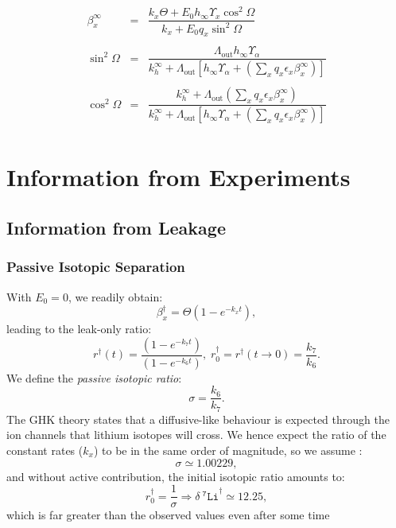 \documentclass[aps,onecolumn,12pt]{revtex4}
\newcommand{\mychem}[1]{\mathtt{#1}}
\newcommand{\spLi}[1]{{~^{\mychem{#1}}\mychem{Li}}}
\newcommand{\deltaLi}{ {\delta\!\!\!\spLi{7}} }
\newcommand{\LiAll}{\Lambda}
\newcommand{\LiAllOut}{{\LiAll}_{\mathrm{out}}}
\newcommand{\todo}[1]{\framebox{\textbf{\color{WildStrawberry}{#1}}}}
\newcommand{\ko}{\dagger}
\begin{document}
\begin{equation}
\begin{array}{rcl}
	\beta_x^\infty & = & \dfrac{k_x\Theta+E_0 h_\infty \Upsilon_x \cos^2\Omega}{k_x+E_0q_x\sin^2\Omega}\\
	\\
	\sin^2\Omega   & = & \dfrac{\LiAllOut h_\infty \Upsilon_\alpha}{k_h^\infty + \LiAllOut\left[ h_\infty \Upsilon_\alpha + \left(\sum_x q_x \epsilon_x \beta_x^\infty\right)\right]}\\
	\\
	\cos^2 \Omega  & = & \dfrac{k_h^\infty + \LiAllOut\left(\sum_x q_x \epsilon_x \beta_x^\infty\right) }{k_h^\infty + \LiAllOut\left[ h_\infty \Upsilon_\alpha + \left(\sum_x q_x \epsilon_x \beta_x^\infty\right)\right]}\\
\end{array}
\end{equation}





\section{Information from Experiments}
\subsection{Information from Leakage}

\subsubsection{Passive Isotopic Separation}
With $E_0=0$, we readily obtain:
\begin{equation}
	\beta^\ko_x = \Theta \left(1-e^{-k_xt} \right),
\end{equation}
leading to the leak-only ratio:
\begin{equation}
	r^\ko(t) =  \dfrac{\left(1-e^{-k_7t} \right)}{\left(1-e^{-k_6t} \right)},\;r^\ko_0 = r^\ko(t\to0) = \dfrac{k_7}{k_6}.
\end{equation}
We define the \textit{passive isotopic ratio}:
\begin{equation}
\label{eq:sigma}
	\sigma  =  \dfrac{k_6}{k_7}.
\end{equation}
The GHK theory states that a diffusive-like behaviour is expected through the ion channels that lithium isotopes will cross.
We hence expect the ratio of the constant rates ($k_x$) to be in the same order of magnitude, so we assume \todo{ref}:
\begin{equation}
	\sigma \simeq 1.00229,
\end{equation}
and without active contribution, the initial isotopic ratio amounts to:
\begin{equation}
	r_0^\ko = \dfrac{1}{\sigma} \Rightarrow \deltaLi^\ko \simeq  12.25,
\end{equation}
which is far greater than the observed values even after some time \todo{ref figures in manuscript+values}
\end{document}
